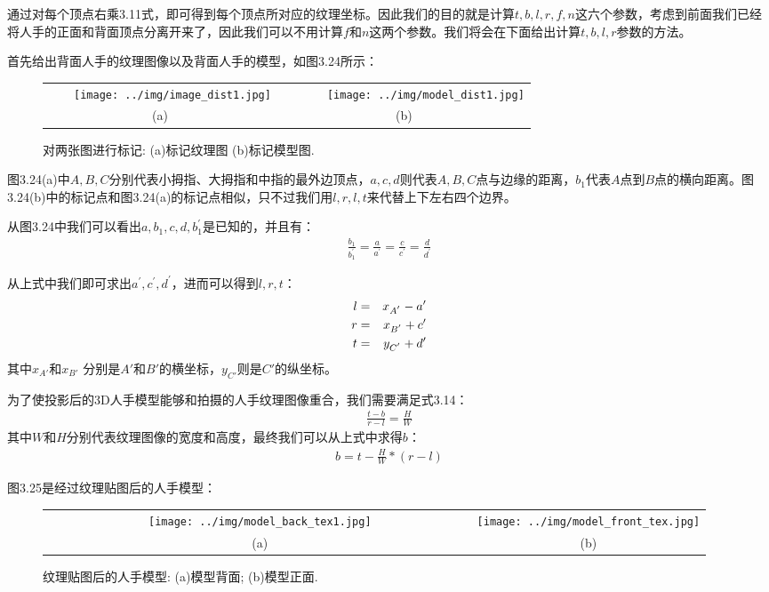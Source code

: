 通过对每个顶点右乘3.11式，即可得到每个顶点所对应的纹理坐标。因此我们的目的就是计算$t,b,l,r,f,n$这六个参数，考虑到前面我们已经将人手的正面和背面顶点分离开来了，因此我们可以不用计算$f$和$n$这两个参数。我们将会在下面给出计算$t,b,l,r$参数的方法。

首先给出背面人手的纹理图像以及背面人手的模型，如图3.24所示：

\begin{figure}[htb]
\begin{tabular}{cc}
~~~~\texttt{[image: ../img/image\_dist1.jpg]}&
~~~~~~~\texttt{[image: ../img/model\_dist1.jpg]}\\
(a)& (b)
\end{tabular}
\caption{对两张图进行标记: (a)标记纹理图 (b)标记模型图.}
\end{figure}
图3.24(a)中$A,B,C$分别代表小拇指、大拇指和中指的最外边顶点，$a,c,d$则代表$A,B,C$点与边缘的距离，$b_{1}$代表$A$点到$B$点的横向距离。图3.24(b)中的标记点和图3.24(a)的标记点相似，只不过我们用$l,r,l,t$来代替上下左右四个边界。

从图3.24中我们可以看出$a,b_{1},c,d,b^{'}_{1}$是已知的，并且有：
\begin{eqnarray}
  \frac{b_{1}}{b^{'}_{1}}=\frac{a}{a^{'}}=\frac{c}{c^{'}}=\frac{d}{d^{'}} 
\end{eqnarray}

从上式中我们即可求出$a^{'},c^{'},d^{'}$，进而可以得到$l,r,t$：
\begin{eqnarray}
l&=&x_{A^{'}}-a'\notag \\
r&=&x_{B^{'}}+c'\\
t&=&y_{C^{'}}+d'\notag
\end{eqnarray}
其中$x_{A'}$和$x_{B'}$ 分别是$A'$和$B'$的横坐标，$y_{C'}$则是$C'$的纵坐标。

为了使投影后的3D人手模型能够和拍摄的人手纹理图像重合，我们需要满足式3.14：
\begin{eqnarray}
\frac{t-b}{r-l} = \frac{H}{W}
\end{eqnarray}
其中$W$和$H$分别代表纹理图像的宽度和高度，最终我们可以从上式中求得$b$：
\begin{eqnarray}
b = t-\frac{H}{W}*(r-l)
\end{eqnarray}

图3.25是经过纹理贴图后的人手模型：
\begin{figure}[htb]
\begin{tabular}{cc}
~~~~~~~~~~~~~~~~\texttt{[image: ../img/model\_back\_tex1.jpg]}&
~~~~~~~~~~~~~~~\texttt{[image: ../img/model\_front\_tex.jpg]}\\
~~~~~~~~~~~~~~~~(a)& ~~~~~~~~~~~~~~~(b)
\end{tabular}
\caption{纹理贴图后的人手模型: (a)模型背面; (b)模型正面.}
\end{figure}

